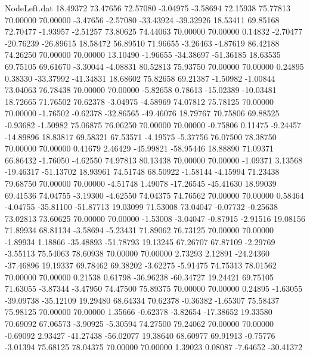 \begin{filecontents}{NodeLeft.dat}
  18.49372   73.47656   72.57080    -3.04975   -3.58694   72.15938   75.77813   70.00000   70.00000   -3.47656   -2.57080  -33.43924  -39.32926
  18.53411   69.85168   72.70477    -1.93957   -2.51257   73.80625   74.44063   70.00000   70.00000    0.14832   -2.70477  -20.76239  -26.89615
  18.58472   56.89510   71.96655    -3.26463   -4.87619   86.42188   74.26250   70.00000   70.00000   13.10490   -1.96655  -34.38697  -51.36185
  18.63535   69.75105   69.61670    -3.30044   -4.08831   80.52813   75.93750   70.00000   70.00000    0.24895    0.38330  -33.37992  -41.34831
  18.68602   75.82658   69.21387    -1.50982   -1.00844   73.04063   76.78438   70.00000   70.00000   -5.82658    0.78613  -15.02389  -10.03481
  18.72665   71.76502   70.62378    -3.04975   -4.58969   74.07812   75.78125   70.00000   70.00000   -1.76502   -0.62378  -32.86565  -49.46076
  18.79767   70.75806   69.88525    -0.93682   -1.50982   75.06875   76.06250   70.00000   70.00000   -0.75806    0.11475   -9.24457  -14.89896
  18.83817   69.58321   67.53571    -4.19575   -5.37756   76.07500   78.38750   70.00000   70.00000    0.41679    2.46429  -45.99821  -58.95446
  18.88890   71.09371   66.86432    -1.76050   -4.62550   74.97813   80.13438   70.00000   70.00000   -1.09371    3.13568  -19.46317  -51.13702
  18.93961   74.51748   68.50922    -1.58144   -4.15994   71.23438   79.68750   70.00000   70.00000   -4.51748    1.49078  -17.26545  -45.41630
  18.99039   69.41536   74.04755    -3.19300   -4.62550   74.04375   74.76562   70.00000   70.00000    0.58464   -4.04755  -35.81100  -51.87713
  19.03099   71.53008   73.04047    -0.07732   -0.25638   73.02813   73.60625   70.00000   70.00000   -1.53008   -3.04047   -0.87915   -2.91516
  19.08156   71.89934   68.81134    -3.58694   -5.23431   71.89062   76.73125   70.00000   70.00000   -1.89934    1.18866  -35.48893  -51.78793
  19.13245   67.26707   67.87109    -2.29769   -3.55113   75.54063   78.60938   70.00000   70.00000    2.73293    2.12891  -24.24360  -37.46896
  19.19337   69.78462   69.38202    -3.62275   -5.91475   74.75313   78.01562   70.00000   70.00000    0.21538    0.61798  -36.96238  -60.34727
  19.24421   69.75105   71.63055    -3.87344   -3.47950   74.47500   75.89375   70.00000   70.00000    0.24895   -1.63055  -39.09738  -35.12109
  19.29480   68.64334   70.62378    -0.36382   -1.65307   75.58437   75.98125   70.00000   70.00000    1.35666   -0.62378   -3.82654  -17.38652
  19.33580   70.69092   67.06573    -3.90925   -5.30594   74.27500   79.24062   70.00000   70.00000   -0.69092    2.93427  -41.27438  -56.02077
  19.38640   68.60977   69.91913    -0.75776   -3.01394   75.68125   78.04375   70.00000   70.00000    1.39023    0.08087   -7.64652  -30.41372

\end{filecontents}

